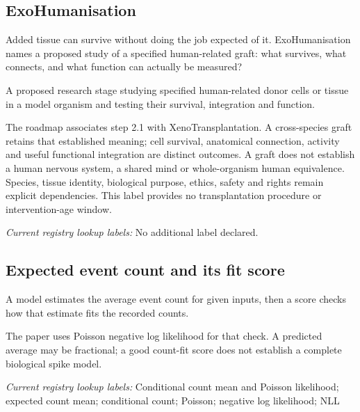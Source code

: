 \subsection*{ExoHumanisation}
\noindent Added tissue can survive without doing the job expected of it. ExoHumanisation names a proposed study of a specified human-related graft: what survives, what connects, and what function can actually be measured?\par
\noindent A proposed research stage studying specified human-related donor cells or tissue in a model organism and testing their survival, integration and function.\par
\noindent The roadmap associates step 2.1 with XenoTransplantation. A cross-species graft retains that established meaning; cell survival, anatomical connection, activity and useful functional integration are distinct outcomes. A graft does not establish a human nervous system, a shared mind or whole-organism human equivalence. Species, tissue identity, biological purpose, ethics, safety and rights remain explicit dependencies. This label provides no transplantation procedure or intervention-age window.\par


\noindent\textit{Current registry lookup labels:} No additional label declared.\par

\begin{samepage}
\subsection*{Expected event count and its fit score}
\noindent A model estimates the average event count for given inputs, then a score checks how that estimate fits the recorded counts.\par
\end{samepage}
\begin{samepage}
\noindent The paper uses Poisson negative log likelihood for that check. A predicted average may be fractional; a good count-fit score does not establish a complete biological spike model.\par\nopagebreak[4]

\end{samepage}


\noindent\textit{Current registry lookup labels:} Conditional count mean and Poisson likelihood; expected count mean; conditional count; Poisson; negative log likelihood; NLL\par

